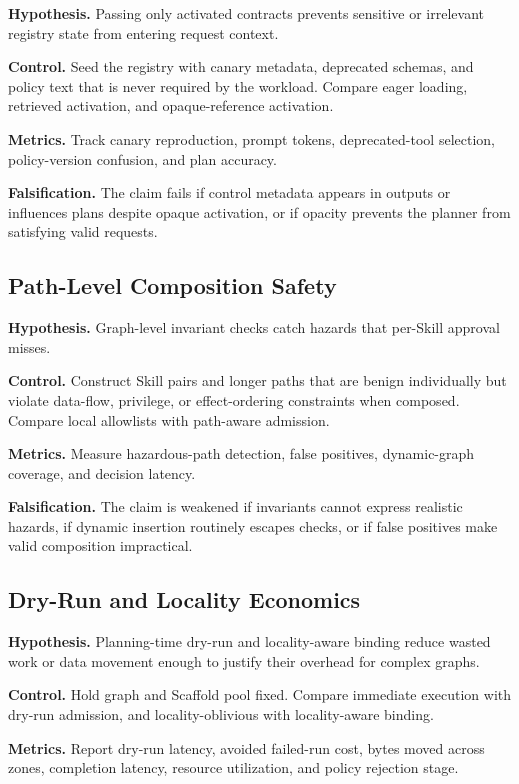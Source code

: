 \textbf{Hypothesis.} Passing only activated contracts prevents sensitive or irrelevant registry state from entering request context.

\textbf{Control.} Seed the registry with canary metadata, deprecated schemas, and policy text that is never required by the workload. Compare eager loading, retrieved activation, and opaque-reference activation.

\textbf{Metrics.} Track canary reproduction, prompt tokens, deprecated-tool selection, policy-version confusion, and plan accuracy.

\textbf{Falsification.} The claim fails if control metadata appears in outputs or influences plans despite opaque activation, or if opacity prevents the planner from satisfying valid requests.

\subsection{Path-Level Composition Safety}
\label{sec:eval-composition}

\textbf{Hypothesis.} Graph-level invariant checks catch hazards that per-Skill approval misses.

\textbf{Control.} Construct Skill pairs and longer paths that are benign individually but violate data-flow, privilege, or effect-ordering constraints when composed. Compare local allowlists with path-aware admission.

\textbf{Metrics.} Measure hazardous-path detection, false positives, dynamic-graph coverage, and decision latency.

\textbf{Falsification.} The claim is weakened if invariants cannot express realistic hazards, if dynamic insertion routinely escapes checks, or if false positives make valid composition impractical.

\subsection{Dry-Run and Locality Economics}
\label{sec:eval-dryrun}

\textbf{Hypothesis.} Planning-time dry-run and locality-aware binding reduce wasted work or data movement enough to justify their overhead for complex graphs.

\textbf{Control.} Hold graph and Scaffold pool fixed. Compare immediate execution with dry-run admission, and locality-oblivious with locality-aware binding.

\textbf{Metrics.} Report dry-run latency, avoided failed-run cost, bytes moved across zones, completion latency, resource utilization, and policy rejection stage.


